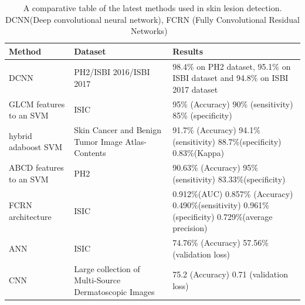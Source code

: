 \begin{table}[htbp]
    \begin{center}
        \begin{tabular}{p{3cm}|p{3cm}|p{6cm}}
        \hline 
        Method & Dataset & Results  \\ 
        \hline 
         DCNN & PH2/ISBI 2016/ISBI 2017 & 98.4\% on PH2 dataset, 95.1\% on ISBI dataset and 94.8\% on ISBI 2017 dataset \\ 
        \hline 
         GLCM features to an SVM & ISIC & 95\% (Accuracy) 90\% (sensitivity) 85\% (specificity) \\ 
        \hline 
            hybrid adaboost SVM  & Skin Cancer and Benign Tumor Image Atlas-Contents & 91.7\% (Accuracy) 94.1\%(sensitivity) 88.7\%(specificity) 0.83\%(Kappa) \\ 
        \hline 
            ABCD features to an SVM & PH2 & 90.63\% (Accuracy) 95\% (sensitivity) 83.33\%(specificity) \\ 
        \hline 
         FCRN architecture & ISIC & 0.912\%(AUC) 0.857\% (Accuracy) 0.490\%(sensitivity) 0.961\%(specificity) 0.729\%(average precision) \\ 
        \hline 
         ANN & ISIC & 74.76\% (Accuracy) 57.56\% (validation loss) \\ 
        \hline 
         CNN & Large collection of Multi-Source Dermatoscopic Images & 75.2 (Accuracy) 0.71 (validation loss) \\ 
        \hline 
        \end{tabular} 
    \end{center}
\caption{A comparative table of the latest methods used in skin lesion detection. DCNN(Deep convolutional neural network), FCRN (Fully Convolutional Residual Networks) ~\cite{Saba2020}}
\label{tab:first}
\end{table}






